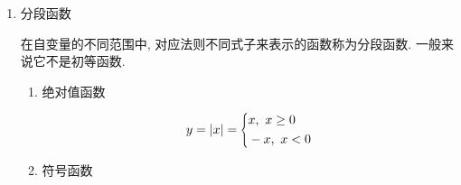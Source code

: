 \begin{enumerate}
\begin{enumerate}
\begin{enumerate}
\begin{enumerate}
\begin{figure}[htp]
\end{figure}
\item 反正切函数和反余切函数\par
反正切函数$ y=\arctan x $, 反余切函数$ y=\arccot x $
\begin{figure}[htp]
\centering
\begin{subfigure}{.475\linewidth}
\centering
{}
\caption{反正切函数图像}
\end{subfigure}
\begin{subfigure}{.475\linewidth}
\caption{反余切函数图像}
\end{subfigure}
\end{figure}
\end{enumerate}
\item 初等函数\par
由基本初等函数经过有限次的四则运算, 以及有限次的复合所构成的可以用一个式子表示的函数称为初等函数.
\end{enumerate}
\item 分段函数\par
在自变量的不同范围中, 对应法则不同式子来表示的函数称为分段函数. 一般来说它不是初等函数.
\begin{enumerate}
\item 绝对值函数\par
\begin{equation*}
y=|x|=
\scaleleftright[6pt]{\biggl\{}{
\begin{aligned}
& x,\ x\ge 0 \\
& -x,\ x<0
\end{aligned}
}{.}
\end{equation*}
\item 符号函数\par

\end{enumerate}
\end{enumerate}
\end{enumerate}
